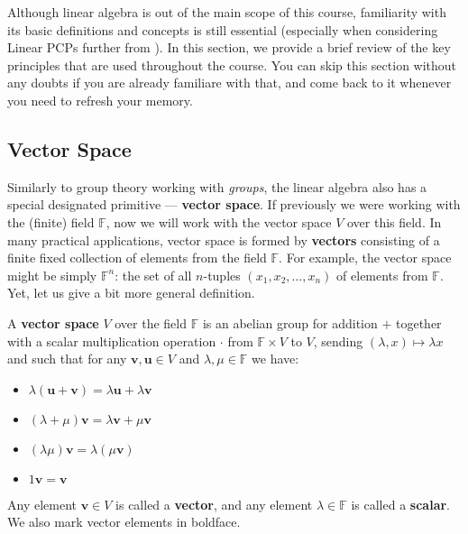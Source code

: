 \documentclass[../lecture-notes-148x210.tex]{subfiles}
\begin{document}
Although linear algebra is out of the main scope of this course, familiarity
with its basic definitions and concepts is still essential (especially when
considering Linear PCPs further from ). In this section, we
provide a brief review of the key principles that are used throughout the
course. You can skip this section without any doubts if you are already
familiare with that, and come back to it whenever you need to refresh your
memory.

\subsection{Vector Space}

Similarly to group theory working with \textit{groups}, the linear algebra also has a special designated primitive --- \textbf{vector space}. If previously we were working
with the (finite) field $\mathbb{F}$, now we will work with the vector space $V$ over this field. In many practical applications,
vector space is formed by \textbf{vectors} consisting of a finite fixed collection of elements from the field $\mathbb{F}$. For example,
the vector space might be simply $\mathbb{F}^n$: the set of all $n$-tuples $(x_1,x_2,\dots,x_n)$ of elements from $\mathbb{F}$. Yet, let us give a bit more general definition.

\begin{definition}
    A \textbf{vector space} $V$ over the field $\mathbb{F}$ is an abelian group for addition $+$ together with a scalar multiplication operation $\cdot$ from $\mathbb{F} \times V$ to $V$, sending $(\lambda,x) \mapsto \lambda x$ and such that for any $\mathbf{v},\mathbf{u} \in V$ and $\lambda,\mu \in \mathbb{F}$ we have:
    \begin{itemize}
        \item $\lambda(\mathbf{u}+\mathbf{v}) = \lambda \mathbf{u} + \lambda \mathbf{v}$
        \item $(\lambda + \mu)\mathbf{v} = \lambda \mathbf{v} + \mu \mathbf{v}$
        \item $(\lambda \mu)\mathbf{v} = \lambda(\mu \mathbf{v})$
        \item $1\mathbf{v} = \mathbf{v}$
    \end{itemize}

    Any element $\mathbf{v} \in V$ is called a \textbf{vector}, and any element $\lambda \in \mathbb{F}$ is called a \textbf{scalar}. We also mark vector elements in boldface.
\end{definition}
\end{document}
